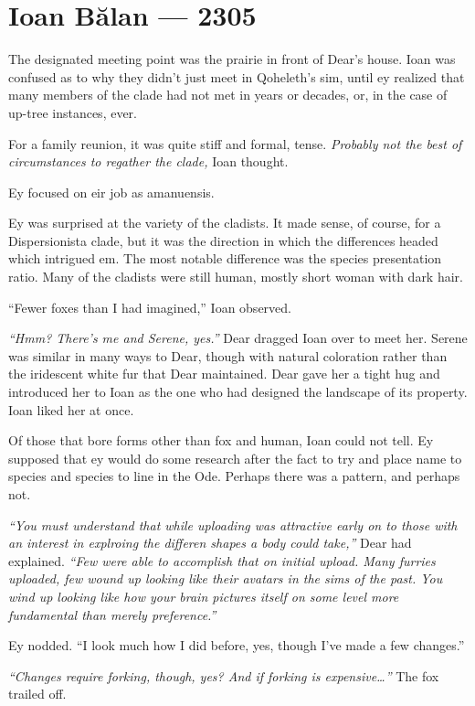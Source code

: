 \hypertarget{ioan-bux103lan-2305}{%
\chapter*{Ioan Bălan — 2305}\label{ioan-bux103lan-2305}}

The designated meeting point was the prairie in front of Dear's house. Ioan was confused as to why they didn't just meet in Qoheleth's sim, until ey realized that many members of the clade had not met in years or decades, or, in the case of up-tree instances, ever.

For a family reunion, it was quite stiff and formal, tense. \emph{Probably not the best of circumstances to regather the clade,} Ioan thought.

Ey focused on eir job as amanuensis.

Ey was surprised at the variety of the cladists. It made sense, of course, for a Dispersionista clade, but it was the direction in which the differences headed which intrigued em. The most notable difference was the species presentation ratio. Many of the cladists were still human, mostly short woman with dark hair.

``Fewer foxes than I had imagined,'' Ioan observed.

\emph{``Hmm? There's me and Serene, yes.''} Dear dragged Ioan over to meet her. Serene was similar in many ways to Dear, though with natural coloration rather than the iridescent white fur that Dear maintained. Dear gave her a tight hug and introduced her to Ioan as the one who had designed the landscape of its property. Ioan liked her at once.

Of those that bore forms other than fox and human, Ioan could not tell. Ey supposed that ey would do some research after the fact to try and place name to species and species to line in the Ode. Perhaps there was a pattern, and perhaps not.

\emph{``You must understand that while uploading was attractive early on to those with an interest in explroing the differen shapes a body could take,''} Dear had explained. \emph{``Few were able to accomplish that on initial upload. Many furries uploaded, few wound up looking like their avatars in the sims of the past. You wind up looking like how your brain pictures itself on some level more fundamental than merely preference.''}

Ey nodded. ``I look much how I did before, yes, though I've made a few changes.''

\emph{``Changes require forking, though, yes? And if forking is expensive\ldots{}''} The fox trailed off.

